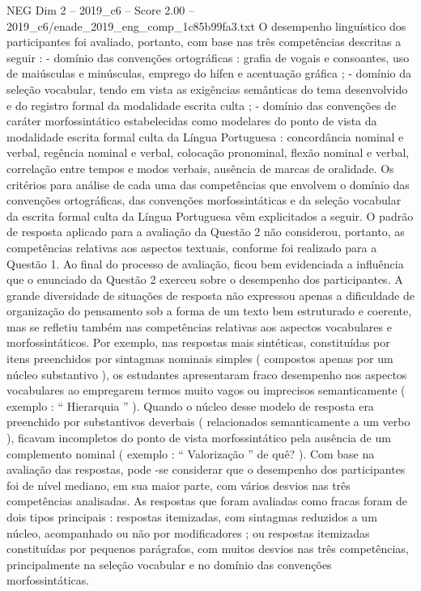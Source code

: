 \begin{textsample}{NEG Dim 2 – 2019\_c6 – Score 2.00 – 2019\_c6/enade\_2019\_eng\_comp\_1c85b99fa3.txt}
O desempenho linguístico dos participantes foi avaliado, portanto, com base nas três competências descritas a seguir : - domínio das convenções ortográficas : grafia de vogais e consoantes, uso de maiúsculas e minúsculas, emprego do hífen e acentuação gráfica ; - domínio da seleção vocabular, tendo em vista as exigências semânticas do tema desenvolvido e do registro formal da modalidade escrita culta ; - domínio das convenções de caráter morfossintático estabelecidas como modelares do ponto de vista da modalidade escrita formal culta da Língua Portuguesa : concordância nominal e verbal, regência nominal e verbal, colocação pronominal, flexão nominal e verbal, correlação entre tempos e modos verbais, ausência de marcas de oralidade.
Os critérios para análise de cada uma das competências que envolvem o domínio das convenções ortográficas, das convenções morfossintáticas e da seleção vocabular da escrita formal culta da Língua Portuguesa vêm explicitados a seguir.
O padrão de resposta aplicado para a avaliação da Questão 2 não considerou, portanto, as competências relativas aos aspectos textuais, conforme foi realizado para a Questão 1.
Ao final do processo de avaliação, ficou bem evidenciada a influência que o enunciado da Questão 2 exerceu sobre o desempenho dos participantes.
A grande diversidade de situações de resposta não expressou apenas a dificuldade de organização do pensamento sob a forma de um texto bem estruturado e coerente, mas se refletiu também nas competências relativas aos aspectos vocabulares e morfossintáticos.
Por exemplo, nas respostas mais sintéticas, constituídas por itens preenchidos por sintagmas nominais simples ( compostos apenas por um núcleo substantivo ), os estudantes apresentaram fraco desempenho nos aspectos vocabulares ao empregarem termos muito vagos ou imprecisos semanticamente ( exemplo : “ Hierarquia ” ).
Quando o núcleo desse modelo de resposta era preenchido por substantivos deverbais ( relacionados semanticamente a um verbo ), ficavam incompletos do ponto de vista morfossintático pela ausência de um complemento nominal ( exemplo : “ Valorização ” de quê? ).
Com base na avaliação das respostas, pode -se considerar que o desempenho dos participantes foi de nível mediano, em sua maior parte, com vários desvios nas três competências analisadas.
As respostas que foram avaliadas como fracas foram de dois tipos principais : respostas itemizadas, com sintagmas reduzidos a um núcleo, acompanhado ou não por modificadores ; ou respostas itemizadas constituídas por pequenos parágrafos, com muitos desvios nas três competências, principalmente na seleção vocabular e no domínio das convenções morfossintáticas.

\end{textsample}
